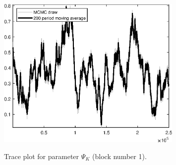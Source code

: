 \begin{figure}[H]
\centering
  \includegraphics[width=0.8\textwidth]{BRS_growth_ext_fd_v1/graphs/TracePlot_Psi_K_blck_1}\\
    \caption{Trace plot for parameter ${\Psi_K}$ (block number 1).}
\end{figure}

